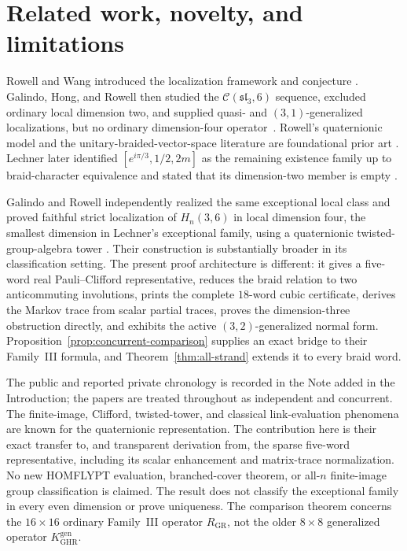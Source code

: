 \documentclass[11pt]{article}
\theoremstyle{remark}
\newcommand{\cC}{\mathcal C}
\begin{document}
\section{Related work, novelty, and limitations}\label{sec:priority}

Rowell and Wang introduced the localization framework and conjecture
\cite{RowellWang2012}.  Galindo, Hong, and Rowell then studied the
\(\cC(\mathfrak{sl}_3,6)\) sequence, excluded ordinary local dimension two,
and supplied quasi- and \((3,1)\)-generalized localizations, but no ordinary
dimension-four operator~\cite[\S5.6]{GHR2013}.  Rowell's quaternionic model
and the unitary-braided-vector-space literature are foundational prior art
\cite{Rowell2011,GalindoRowell2014}.  Lechner later identified
\([e^{i\pi/3},1/2,2m]\) as the remaining existence family up to
braid-character equivalence and stated that its dimension-two member is empty
\cite[p.~16, discussion following Proposition~3.6]{Lechner2026}.

Galindo and Rowell independently realized the same exceptional local class and
proved faithful strict localization of \(H_n(3,6)\) in local dimension four,
the smallest dimension in Lechner's exceptional family, using a quaternionic
twisted-group-algebra tower
\cite[\S13]{GalindoRowell2026}.  Their construction is substantially broader
in its classification setting.  The present proof architecture is different:
it gives a five-word real Pauli--Clifford representative, reduces the braid
relation to two anticommuting involutions, prints the complete \(18\)-word
cubic certificate, derives the Markov trace from scalar partial traces, proves
the dimension-three obstruction directly, and exhibits the active
\((3,2)\)-generalized normal form.  Proposition~\ref{prop:concurrent-comparison}
supplies an exact bridge to their Family~III formula, and
Theorem~\ref{thm:all-strand} extends it to every braid word.

The public and reported private chronology is recorded in the Note added in
the Introduction; the papers are treated throughout as independent and
concurrent.  The finite-image, Clifford, twisted-tower, and classical
link-evaluation phenomena are known for the quaternionic representation.  The
contribution here is their exact transfer to, and transparent derivation from,
the sparse five-word representative, including its scalar enhancement and
matrix-trace normalization.  No new HOMFLYPT evaluation, branched-cover
theorem, or all-\(n\) finite-image group classification is claimed.  The result
does not classify the exceptional family in every even dimension or prove
uniqueness.  The comparison theorem concerns the \(16\times16\) ordinary
Family~III operator \(R_{\mathrm{GR}}\), not the older \(8\times8\) generalized
operator \(K_{\mathrm{GHR}}^{\mathrm{gen}}\).
\end{document}
